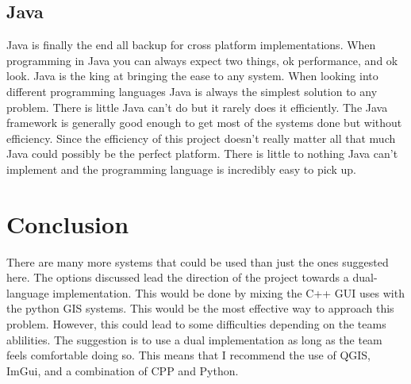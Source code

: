 \documentclass[onecolumn, draftclsnofoot,10pt, compsoc]{IEEEtran}
\begin{document}
      \subsection{Java}
      Java is finally the end all backup for cross platform implementations. When programming in Java you can always expect two things, ok performance, and ok look. Java is the king at bringing the ease to any system. When looking into different programming languages Java is always the simplest solution to any problem. There is little Java can't do but it rarely does it efficiently. The Java framework is generally good enough to get most of the systems done but without efficiency. Since the efficiency of this project doesn't really matter all that much Java could possibly be the perfect platform. There is little to nothing Java can't implement and the programming language is incredibly easy to pick up. 

      \section{Conclusion}
      There are many more systems that could be used than just the ones suggested here. The options discussed lead the direction of the project towards a dual-language implementation. This would be done by mixing the C++ GUI uses with the python GIS systems. This would be the most effective way to approach this problem. However, this could lead to some difficulties depending on the teams ablilities. The suggestion is to use a dual implementation as long as the team feels comfortable doing so. This means that I recommend the use of QGIS, ImGui, and a combination of CPP and Python.
        
\end{document}
